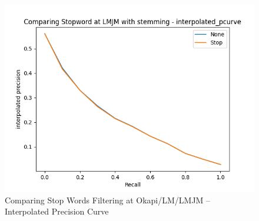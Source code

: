\documentclass[10pt, a4paper]{article}
\begin{document}
\begin{figure}[h!]
\includegraphics[scale=0.3]{compare stop/Comparing Stopword at LMJM with stemming - interpolated_pcurve-ipd.png}
\caption{Comparing Stop Words Filtering at Okapi/LM/LMJM -- Interpolated Precision Curve}
\label{fig:stop_i}
\end{figure}
\end{document}
